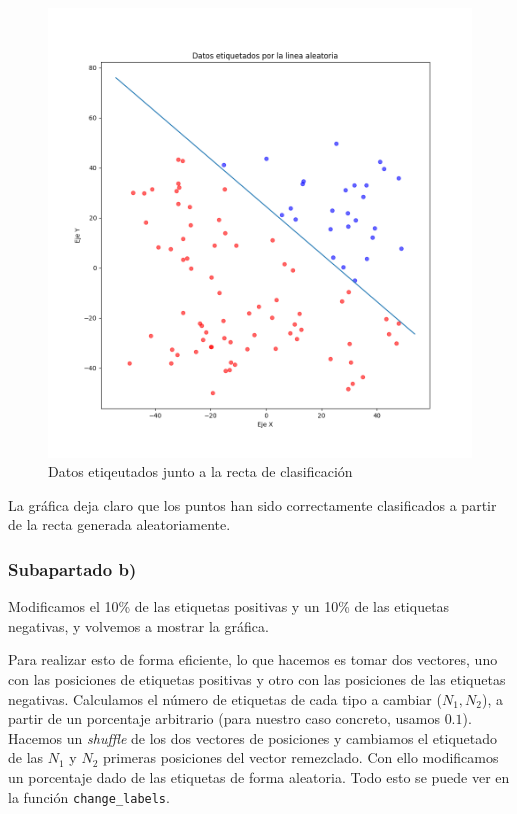 \documentclass[11pt]{article}
\begin{document}
\begin{figure}[H]
    \includegraphics[width=0.9 \textwidth]{puntos_clasificados_recta01}
    \caption{Datos etiqeutados junto a la recta de clasificación}
\end{figure}

La gráfica deja claro que los puntos han sido correctamente clasificados a partir de la recta generada aleatoriamente.

\subsubsection{Subapartado b)} \label{section:ejercicio1.2.b}

Modificamos el 10\% de las etiquetas positivas y un 10\% de las etiquetas negativas, y volvemos a mostrar la gráfica.

Para realizar esto de forma eficiente, lo que hacemos es tomar dos vectores, uno con las posiciones de etiquetas positivas y otro con las posiciones de las etiquetas negativas. Calculamos el número de etiquetas de cada tipo a cambiar ($N_1, N_2$), a partir de un porcentaje arbitrario (para nuestro caso concreto, usamos $0.1$). Hacemos un \emph{shuffle} de los dos vectores de posiciones y cambiamos el etiquetado de las $N_1$ y $N_2$ primeras posiciones del vector remezclado. Con ello modificamos un porcentaje dado de las etiquetas de forma aleatoria. Todo esto se puede ver en la función \lstinline{change_labels}.
\end{document}
